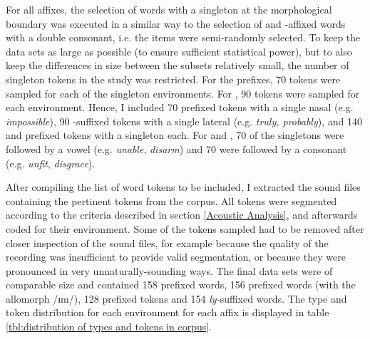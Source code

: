 For all affixes, the selection of words with a singleton at the morphological boundary was executed in a similar way to the selection of  and -affixed words with a double consonant, i.e. the items were semi-randomly selected. To keep the data sets as large as possible (to ensure sufficient statistical power), but to also keep the differences in size between the subsets relatively small, the number of singleton tokens in the study was restricted. For the prefixes, 70 tokens were sampled for each of the singleton environments. For , 90 tokens were sampled for each environment. 
Hence, I included 70 prefixed tokens with a single nasal (e.g. \textit{impossible}),  90 -suffixed tokens with a single lateral (e.g. \textit{truly, probably}), and 140  and prefixed tokens with a singleton each. For  and , 70 of the singletons were followed by a vowel (e.g. \textit{unable}, \textit{disarm}) and 70 were followed by a consonant (e.g. \textit{unfit}, \textit{disgrace}).

After compiling the list of word tokens to be included, I extracted the sound files containing the pertinent tokens from the corpus. All tokens were segmented according to the criteria described in section \ref{Acoustic Analysis}, and afterwards coded for their environment.
Some of the tokens sampled had to be removed after closer inspection of the sound files,  for example because the quality of the recording was insufficient to provide valid segmentation, or because they were pronounced in very unnaturally-sounding ways. The final data sets were of comparable size and contained 158 prefixed words, 156 prefixed words (with the allomorph /ɪm/), 128 prefixed tokens and 154 \textit{ly-}suffixed words.  The type and token distribution for each environment for each affix is displayed  in table \ref{tbl:distribution of types and tokens in corpus}.


